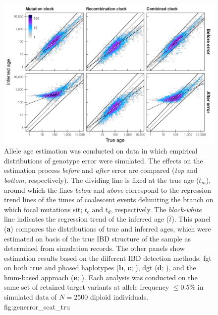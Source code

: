 

\begin{figure}[tb]
{\small{}} \\
\includegraphics[width=\textwidth]{./img/ch5/generror_scat_tru}
{Allele age estimation was conducted on data in which empirical distributions of genotype error were simulated.
The effects on the estimation process \emph{before} and \emph{after} error are compared (\emph{top} and \emph{bottom}, respectively).
The dividing line is fixed at the true age ($t_m$), around which the lines \emph{below} and \emph{above} correspond to the regression trend lines of the times of coalescent events delimiting the branch on which focal mutations sit; \ie $t_c$ and $t_d$, respectively.
The \emph{black-white} line indicates the regression trend of the inferred age ($\hat{t}$).
This panel (\textbf{a}) compares the distributions of true and inferred ages, which were estimated on basis of the true IBD structure of the sample as determined from simulation records.
The other panels show estimation results based on the different IBD detection methods;
\gls{fgt} on both true and phased haplotypes (\textbf{b}, \textbf{c}; ),
\gls{dgt} (\textbf{d}; ),
and the \gls{hmm}-based approach (\textbf{e}; ).
Each analysis was conducted on the same set of retained  target variants at allele frequency ${\leq 0.5\%}$ in simulated data of ${N=\num{2500}}$ diploid individuals.}
{fig:generror_scat_tru}
\end{figure}
